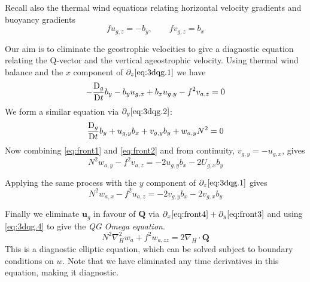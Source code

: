 \documentclass{jknotes}
\begin{document}
Recall also the thermal wind equations relating horizontal velocity gradients
and buoyancy gradients
\begin{equation}
	fu_{g,z} = -b_y, \hspace{2em} fv_{g,z} = b_x
\end{equation}

Our aim is to eliminate the geostrophic velocities to give a diagnostic
equation relating the Q-vector and the vertical ageostrophic velocity. Using
thermal wind balance and the $x$ component of $\partial_z \eqref{eq:3dqg.1}$
we have
\begin{equation}
	-\frac{\mathrm{D}_g}{\mathrm{D} t} b_y - b_y u_{g,x} + b_x u_{g,y} - f^2 v_{a,z} =
	0 \label{eq:front1}
\end{equation}
We form a similar equation via $\partial_y \eqref{eq:3dqg.2}$:
\begin{equation}
	\frac{\mathrm{D}_g}{\mathrm{D} t} b_y + u_{g,y} b_x + v_{g,y} b_y + w_{a,y}N^2 = 0
	\label{eq:front2}
\end{equation}
Now combining \eqref{eq:front1} and \eqref{eq:front2} and from continuity,
$v_{g,y} = -u_{g,x}$, gives
\begin{equation}
	N^2 w_{a,y} - f^2 v_{a,z} = -2u_{g,y} b_x - 2U_{g,x} b_y \label{eq:front3}
\end{equation}

Applying the same process with the $y$ component of $\partial_z
\eqref{eq:3dqg.1}$ gives
\begin{equation}
	N^2 w_{a,x} - f^2 u_{a,z} = -2v_{g,y} b_x - 2v_{g,x} b_y \label{eq:front4}
\end{equation}

Finally we eliminate $\symbf{u}_g$ in favour of $\symbf{Q}$ via $\partial_x
\eqref{eq:front4} + \partial_y \eqref{eq:front3}$ and using \eqref{eq:3dqg.4}
to give the \emph{QG Omega equation}.
\begin{equation}
	N^2 \nabla_H^2 w_a + f^2 w_{a,zz} = 2 \nabla_H \cdot \symbf{Q}
\end{equation}
This is a diagnostic elliptic equation, which can be solved subject to
boundary conditions on $w$. Note that we have eliminated any time derivatives
in this equation, making it diagnostic.

\end{document}
